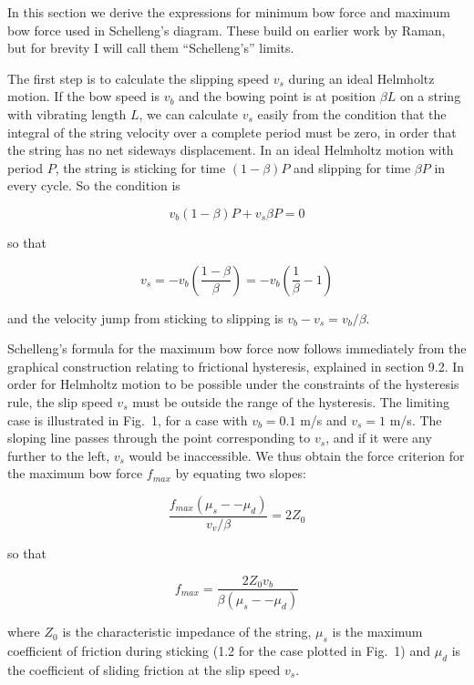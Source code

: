   In this section we derive the expressions for minimum bow force and maximum 
  bow force used in Schelleng's diagram. These build on earlier work by Raman, 
  but for brevity I will call them ``Schelleng's'' limits. 

  The first step is to calculate the slipping speed $v_s$ during an ideal 
  Helmholtz motion. If the bow speed is $v_b$ and the bowing point is at 
  position $\beta L$ on a string with vibrating length $L$, we can calculate 
  $v_s$ easily from the condition that the integral of the string velocity over 
  a complete period must be zero, in order that the string has no net sideways 
  displacement. In an ideal Helmholtz motion with period $P$, the string is 
  sticking for time $(1-\beta) P$ and slipping for time $\beta P$ in every 
  cycle. So the condition is 

  $$v_b (1-\beta) P + v_s \beta P = 0 \tag{1}$$ 

  so that 

  $$v_s=-v_b \left(\dfrac{1-\beta}{\beta} \right)=-v_b \left(\dfrac{1}{\beta} 
  -1 \right) \tag{2}$$ 

  and the velocity jump from sticking to slipping is $v_b-v_s = v_b/\beta$. 


  Schelleng's formula for the maximum bow force now follows immediately from 
  the graphical construction relating to frictional hysteresis, explained in 
  section 9.2. In order for Helmholtz motion to be possible under the 
  constraints of the hysteresis rule, the slip speed $v_s$ must be outside the 
  range of the hysteresis. The limiting case is illustrated in Fig.\ 1, for a 
  case with $v_b=0.1$ m/s and $v_s =1$ m/s. The sloping line passes through the 
  point corresponding to $v_s$, and if it were any further to the left, $v_s$ 
  would be inaccessible. We thus obtain the force criterion for the maximum bow 
  force $f_{max}$ by equating two slopes: 

  $$\dfrac{f_{max} (\mu_s -- \mu_d)}{v_v/\beta}=2 Z_0 \tag{3}$$ 

  so that 

  $$f_{max}=\dfrac{2Z_0 v_b}{\beta (\mu_s -- \mu_d)} \tag{4}$$ 

  where $Z_0$ is the characteristic impedance of the string, $\mu_s$ is the 
  maximum coefficient of friction during sticking (1.2 for the case plotted in 
  Fig.\ 1) and $\mu_d$ is the coefficient of sliding friction at the slip speed 
  $v_s$. 

